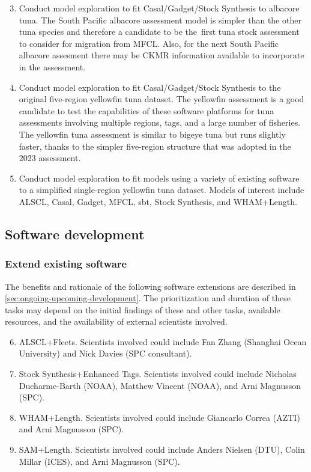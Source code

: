 \documentclass{SCreport}
\begin{document}
\begin{enumerate}\setcounter{enumi}{2}
  \item Conduct model exploration to fit Casal/Gadget/Stock Synthesis to
  albacore tuna. The South Pacific albacore assessment model is simpler than the
  other tuna species and therefore a candidate to be the~first tuna stock
  assessment to consider for migration from MFCL. Also, for the next South
  Pacific albacore assesment there may be CKMR information available to
  incorporate in the assessment.
  \item Conduct model exploration to fit Casal/Gadget/Stock Synthesis to the
  original five-region yellowfin tuna dataset. The yellowfin assessment is a
  good candidate to test the capabilities of these software platforms for tuna
  assessments involving multiple regions, tags, and a large number of fisheries.
  The yellowfin tuna assessment is similar to bigeye tuna but runs slightly
  faster, thanks to the simpler \mbox{five-region} structure that was adopted in
  the 2023 assessment.
  \item Conduct model exploration to fit models using a variety of existing
  software to a simplified single-region yellowfin tuna dataset. Models of
  interest include ALSCL, Casal, Gadget, MFCL, sbt, Stock Synthesis, and
  WHAM+Length.
\end{enumerate}

\subsection{Software development}

\subsubsection{Extend existing software}

The benefits and rationale of the following software extensions are described in
\autoref{sec:ongoing-upcoming-development}. The prioritization and duration of
these tasks may depend on the initial findings of these and other tasks,
available resources, and the availability of external scientists involved.

\begin{enumerate}\setcounter{enumi}{5}
  \item ALSCL+Fleets. Scientists involved could include Fan Zhang (Shanghai
  Ocean University) and Nick Davies (SPC consultant).
  \item Stock Synthesis+Enhanced Tags. Scientists involved could include
  Nicholas Ducharme-Barth (NOAA), Matthew Vincent (NOAA), and Arni Magnusson
  (SPC).
  \item WHAM+Length. Scientists involved could include Giancarlo Correa (AZTI)
  and Arni Magnusson (SPC).
  \item SAM+Length. Scientists involved could include Anders Nielsen (DTU),
  Colin Millar (ICES), and Arni Magnusson (SPC).
\end{enumerate}
\end{document}

